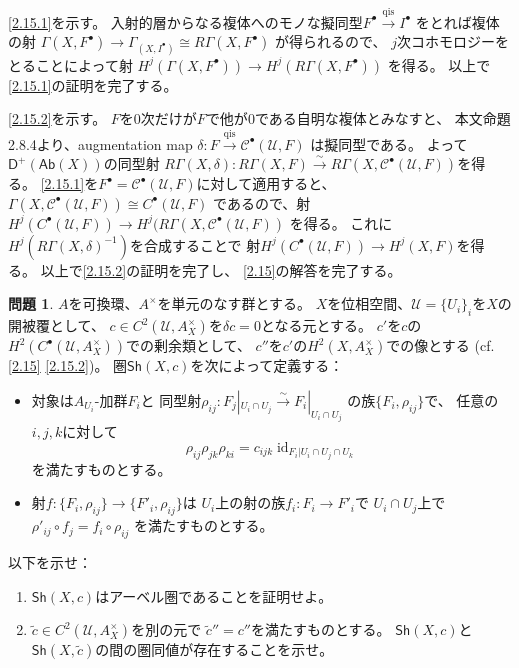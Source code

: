\documentclass[uplatex,dvipdfmx]{jsarticle}
\makeatletter
\theoremstyle{definition}
\newtheorem{prob}[prob]{問題}
\renewenvironment{proof}[1][\proofname]{
  \pushQED{\qed}%
  \normalfont \topsep6\p@\@plus6\p@\relax
  \trivlist
  \item[\hskip\labelsep
    #1\@addpunct{\textbf{.}}]\ignorespaces
}{%
  \popQED\endtrivlist\@endpefalse
}
\providecommand{\proofname}{証明}
\DeclareMathOperator{\id}{\mathrm{id}}
\newcommand{\Sh}{\mathsf{Sh}}
\newcommand{\Ab}{\mathsf{Ab}}
\newcommand{\sfD}{\mathsf{D}}
\newcommand\mcC{\mathcal{C}}
\newcommand\mcU{\mathcal{U}}
\makeatother
\begin{document}
\begin{proof}
  \ref{2.15.1}を示す。
  入射的層からなる複体へのモノな擬同型\(F^{\bullet}\xrightarrow{\text{qis}}I^{\bullet}\)
  をとれば複体の射
  \(\Gamma(X,F^{\bullet})\to \Gamma_(X,I^{\bullet})\cong R\Gamma(X,F^{\bullet})\)
  が得られるので、
  \(j\)次コホモロジーをとることによって射
  \(H^j(\Gamma(X,F^{\bullet})) \to H^j(R\Gamma(X,F^{\bullet}))\)
  を得る。
  以上で\ref{2.15.1}の証明を完了する。

  \ref{2.15.2}を示す。
  \(F\)を\(0\)次だけが\(F\)で他が\(0\)である自明な複体とみなすと、
  本文命題2.8.4より、augmentation map
  \(\delta:F\xrightarrow{\text{qis}} \mcC^{\bullet}(\mcU,F)\)
  は擬同型である。
  よって\(\sfD^+(\Ab(X))\)の同型射
  \(R\Gamma(X,\delta):R\Gamma(X,F)\xrightarrow{\sim}
  R\Gamma(X,\mcC^{\bullet}(\mcU,F))\)を得る。
  \ref{2.15.1}を\(F^{\bullet} = \mcC^{\bullet}(\mcU,F)\)に対して適用すると、
  \(\Gamma(X,\mcC^{\bullet}(\mcU,F)) \cong C^{\bullet}(\mcU,F)\)
  であるので、射
  \(H^j(C^{\bullet}(\mcU,F)) \to H^j(R\Gamma(X,\mcC^{\bullet}(\mcU,F))\)
  を得る。
  これに\(H^j(R\Gamma(X,\delta)^{-1})\)を合成することで
  射\(H^j(C^{\bullet}(\mcU,F))\to H^j(X,F)\)を得る。
  以上で\ref{2.15.2}の証明を完了し、
  \autoref{2.15}の解答を完了する。
\end{proof}










\begin{prob}\label{2.16}
  \(A\)を可換環、\(A^{\times}\)を単元のなす群とする。
  \(X\)を位相空間、\(\mcU=\{U_i\}_i\)を\(X\)の開被覆として、
  \(c\in C^2(\mcU,A_X^{\times})\)を\(\delta c = 0\)となる元とする。
  \(c'\)を\(c\)の\(H^2(C^{\bullet}(\mcU,A_X^{\times}))\)での剰余類として、
  \(c''\)を\(c'\)の\(H^2(X,A_X^{\times})\)での像とする
  (cf. \autoref{2.15} \ref{2.15.2})。
  圏\(\Sh(X,c)\)を次によって定義する：
  \begin{itemize}
    \item
    対象は\(A_{U_i}\)-加群\(F_i\)と
    同型射\(\rho_{ij}:F_j|_{U_i\cap U_j}\xrightarrow{\sim} F_i|_{U_i\cap U_j}\)
    の族\(\{F_i,\rho_{ij}\}\)で、
    任意の\(i,j,k\)に対して
    \[
    \rho_{ij}\rho_{jk}\rho_{ki} = c_{ijk}\id_{F_i|U_i\cap U_j\cap U_k}
    \]
    を満たすものとする。
    \item
    射\(f:\{F_i,\rho_{ij}\}\to \{F'_i,\rho_{ij}\}\)は
    \(U_i\)上の射の族\(f_i:F_i\to F'_i\)で
    \(U_i\cap U_j\)上で\(\rho'_{ij}\circ f_j = f_i\circ \rho_{ij}\)
    を満たすものとする。
  \end{itemize}
  以下を示せ：
  \begin{enumerate}
    \item \label{2.16.1}
    \(\Sh(X,c)\)はアーベル圏であることを証明せよ。
    \item \label{2.16.2}
    \(\tilde{c}\in C^2(\mcU,A_X^{\times})\)を別の元で
    \(\tilde{c}'' = c''\)を満たすものとする。
    \(\Sh(X,c)\)と\(\Sh(X,\tilde{c})\)の間の圏同値が存在することを示せ。
  \end{enumerate}
\end{prob}
\end{document}

